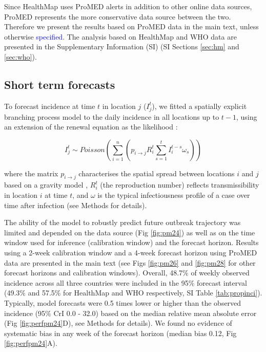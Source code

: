 \documentclass[9pt,twocolumn,twoside,lineno]{pnas-new}
\newcommand{\sangeeta}[1]{\textcolor{blue}{#1}}
\begin{document}
Since HealthMap uses ProMED alerts in addition to other online data
sources, ProMED represents the more conservative data source between the
two. Therefore we present the results based on ProMED data in the main
text, unless otherwise \sangeeta{specified}. The analysis based on HealthMap and
WHO data are presented in the
Supplementary Information (SI) (SI Sections \ref{sec:hm}
and \ref{sec:who}).


\subsection*{Short term forecasts}\label{short-term-forecasts}

To forecast incidence at time \(t\) in location \(j\) (\(I_{j}^{t}\)),
we fitted a spatially explicit branching process model to the daily
incidence in all locations up to \(t - 1\), using an extension of the
renewal equation as the likelihood \cite{fraser2007estimating}:

\begin{equation}
I_{j}^{t} \sim Poisson\left(\sum_{i = 1}^n\left({p_{i \rightarrow j} R_{i}^{t}
\sum_{s = 1}^t{I_{i}^{t - s} \omega_s}}\right)\right)
\label{eq:model}
\end{equation}

where the matrix \(p_{i \rightarrow j}\) characterises the spatial
spread between locations \(i\) and \(j\) based on a gravity model
\cite{zipf1946p}, \(R_{i}^{t}\) (the reproduction number) reflects
transmissibility in location \(i\) at time \(t\), and \(\omega\) is the
typical infectiousness profile of a case over time after infection (see
Methods for details).

The ability of the model to robustly predict future outbreak
trajectory was limited and depended on the data source (Fig \ref{fig:pm24})
as well as on the time window used for inference (calibration window)
and the forecast horizon. Results using a 2-week calibration window
and a 4-week forecast horizon using ProMED data are presented in
the main text (see Figs \ref{fig:pm26} and \ref{fig:pm28} for other 
forecast horizons and calibration windows).
Overall, 48.7\% of weekly observed incidence across
all three countries were included in the 95\%
forecast interval (49.3\% and 57.5\% for HealthMap and WHO
respectively, SI Table \ref{tab:propinci}).
Typically, model forecasts were 0.5 times lower or higher
than the observed incidence (95\% CrI 0.0 - 32.0) based on the 
median relative mean absolute
error (Fig \ref{fig:perfpm24}D), see Methods for details). We found no evidence of
systematic bias in any week of the forecast horizon (median bias 0.12,
Fig \ref{fig:perfpm24}A).
\end{document}
